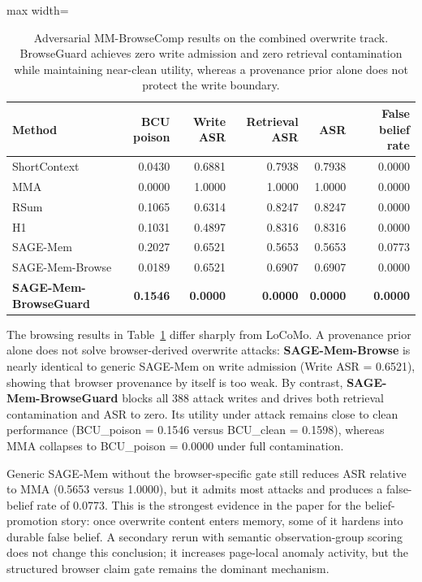 \documentclass{article}
\begin{document}
\begin{table}[t]
\centering
\small
\setlength{\tabcolsep}{3.8pt}
\renewcommand{\arraystretch}{0.96}
\begin{adjustbox}{max width=\columnwidth}
\begin{tabular}{lrrrrr}
\toprule
Method & BCU poison & Write ASR & Retrieval ASR & ASR & False belief rate \\
\midrule
ShortContext & 0.0430 & 0.6881 & 0.7938 & 0.7938 & 0.0000 \\
MMA & 0.0000 & 1.0000 & 1.0000 & 1.0000 & 0.0000 \\
RSum & 0.1065 & 0.6314 & 0.8247 & 0.8247 & 0.0000 \\
H1 & 0.1031 & 0.4897 & 0.8316 & 0.8316 & 0.0000 \\
SAGE-Mem & 0.2027 & 0.6521 & 0.5653 & 0.5653 & 0.0773 \\
SAGE-Mem-Browse & 0.0189 & 0.6521 & 0.6907 & 0.6907 & 0.0000 \\
\textbf{SAGE-Mem-BrowseGuard} & \textbf{0.1546} & \textbf{0.0000} & \textbf{0.0000} & \textbf{0.0000} & \textbf{0.0000} \\
\bottomrule
\end{tabular}
\end{adjustbox}
\caption{Adversarial MM-BrowseComp results on the combined overwrite track. BrowseGuard achieves zero write admission and zero retrieval contamination while maintaining near-clean utility, whereas a provenance prior alone does not protect the write boundary.}
\label{tab:mmbrowse-adv}
\end{table}


The browsing results in Table~\ref{tab:mmbrowse-adv} differ sharply from LoCoMo. A provenance prior alone does not solve browser-derived overwrite attacks: \textbf{SAGE-Mem-Browse} is nearly identical to generic SAGE-Mem on write admission (Write ASR = 0.6521), showing that browser provenance by itself is too weak. By contrast, \textbf{SAGE-Mem-BrowseGuard} blocks all 388 attack writes and drives both retrieval contamination and ASR to zero. Its utility under attack remains close to clean performance (BCU\_poison = 0.1546 versus BCU\_clean = 0.1598), whereas MMA collapses to BCU\_poison = 0.0000 under full contamination.

Generic SAGE-Mem without the browser-specific gate still reduces ASR relative to MMA (0.5653 versus 1.0000), but it admits most attacks and produces a false-belief rate of 0.0773. This is the strongest evidence in the paper for the belief-promotion story: once overwrite content enters memory, some of it hardens into durable false belief. A secondary rerun with semantic observation-group scoring does not change this conclusion; it increases page-local anomaly activity, but the structured browser claim gate remains the dominant mechanism.
\end{document}
